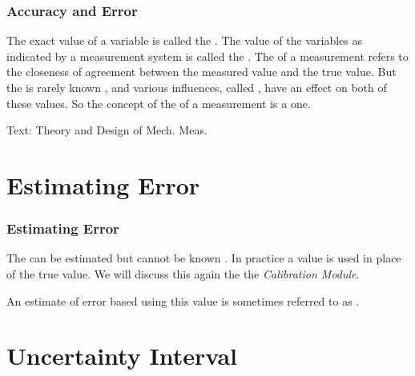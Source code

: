 \documentclass[fleqn]{beamer} %
\newcommand{\sectiontitleII}{Accuracy and Error}
\newcommand{\sectiontitleIII}{Estimating Error}
\newcommand{\sectiontitleIV}{Uncertainty Interval}
\begin{document}
\begin{frame}[label=sectionII]
\frametitle{\sectiontitleII}


The exact value of a variable is called the \hspcu \hspc \hspcu. The value of the variables as indicated by a
measurement system is called the \hspcu \hspc \hspcu. The \hspcu of a measurement refers to the
closeness of agreement between the measured value and the true value. But the \hspcu \hspc \hspcu is rarely
known \hspcu, and various influences, called \hspcu, have an effect on both of these values. So the
concept of the \hspcu of a measurement is a \hspcu one. \vspcc

\begin{framed}
\end{framed}

\vspace{0mm}
{\tiny Text: Theory and Design of Mech. Meas.}
\end{frame}

\section{\sectiontitleIII}

\begin{frame}[label=sectionIII]
\frametitle{\sectiontitleIII}

The \hspcu \hspc \hspcu can be estimated but cannot be known  \hspcu. In practice a \hspcu value is used in place of the true value. We will discuss this again the the {\it Calibration Module}.


\begin{framed}%
\end{framed}

An estimate of error based using this value is sometimes referred to as \hspcu \hspc \hspcu. \vspc

\end{frame}

\section{\sectiontitleIV}
\end{document}
